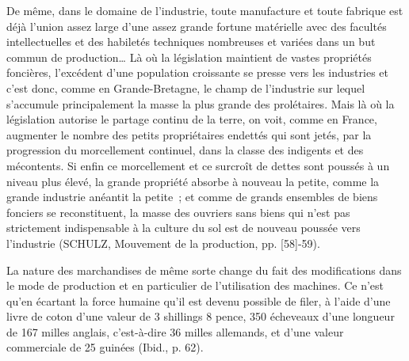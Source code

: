 \documentclass[french,twoside]{book} %
\newenvironment{quoteblock}%
  {\begin{quoting}}
  {\end{quoting}}
\newenvironment{quotebar}{%
    \def\FrameCommand{{\color{rubric!10!}\vrule width 0.5em} \hspace{0.9em}}%
    \def\OuterFrameSep{\itemsep} %
    \MakeFramed {\advance\hsize-\width \FrameRestore}
  }%
  {%
    \endMakeFramed
  }
\renewenvironment{quoteblock}%
  {%
    \savenotes
    \setstretch{0.9}
    \normalfont
    \begin{quotebar}
  }
  {%
    \end{quotebar}
    \spewnotes
  }
\begin{document}
\begin{quoteblock}
 \noindent De même, dans le domaine de l’industrie, toute manufacture et toute fabrique est déjà l’union assez large d’une assez grande fortune matérielle avec des facultés intellectuelles et des habiletés techniques nombreuses et variées dans un but commun de production… Là où la législation maintient de vastes propriétés foncières, l’excédent d’une population croissante se presse vers les industries et c’est donc, comme en Grande-Bretagne, le champ de l’industrie sur lequel s’accumule principalement la masse la plus grande des prolétaires. Mais là où la législation autorise le partage continu de la terre, on voit, comme en France, augmenter le nombre des petits propriétaires endettés qui sont jetés, par la progression du morcellement continuel, dans la classe des indigents et des mécontents. Si enfin ce morcellement et ce surcroît de dettes sont poussés à un niveau plus élevé, la grande propriété absorbe à nouveau la petite, comme la grande industrie anéantit la petite ; et comme de grands ensembles de biens fonciers se reconstituent, la masse des ouvriers sans biens qui n’est pas strictement indispensable à la culture du sol est de nouveau poussée vers l’industrie (SCHULZ, Mouvement de la production, pp. [58]-59).\par
 La nature des marchandises de même sorte change du fait des modifications dans le mode de production et en particulier de l’utilisation des machines. Ce n’est qu’en écartant la force humaine qu’il est devenu possible de filer, à l’aide d’une livre de coton d’une valeur de 3 shillings 8 pence, 350 écheveaux d’une longueur de 167 milles anglais, c’est-à-dire 36 milles allemands, et d’une valeur commerciale de 25 guinées (Ibid., p. 62).\par

\end{quoteblock}
\end{document}
